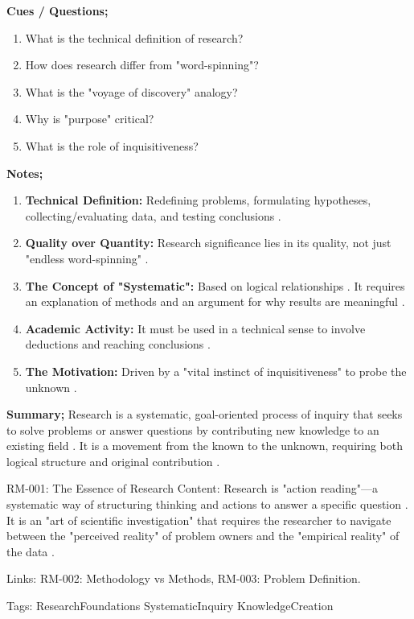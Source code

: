 \documentclass{report}
\begin{document}
\begin{cornellnotes}
	\textbf{Cues / Questions;}
	\begin{enumerate}
		\item What is the technical definition of research?
		\item How does research differ from "word-spinning"?
		\item What is the "voyage of discovery" analogy?
		\item Why is "purpose" critical?
		\item What is the role of inquisitiveness?
	\end{enumerate}
	\textbf{Notes;}
	\begin{enumerate}
		\item \textbf{Technical Definition:} Redefining problems, formulating hypotheses, collecting/evaluating data, and testing conclusions
		.
		\item \textbf{Quality over Quantity:} Research significance lies in its quality, not just "endless word-spinning"
		.
		\item \textbf{The Concept of "Systematic":} Based on logical relationships
		. It requires an explanation of methods and an argument for why results are meaningful
		.
		\item \textbf{Academic Activity:} It must be used in a technical sense to involve deductions and reaching conclusions
		.
		\item \textbf{The Motivation:} Driven by a "vital instinct of inquisitiveness" to probe the unknown
		.
	\end{enumerate}
	\textbf{Summary;}
	Research is a systematic, goal-oriented process of inquiry that seeks to solve problems or answer questions by contributing new knowledge to an existing field
	. It is a movement from the known to the unknown, requiring both logical structure and original contribution
	.
\end{cornellnotes}

\begin{zettelkasteinnotes}
RM-001: The Essence of Research Content: Research is "action reading"—a systematic way of structuring thinking and actions to answer a specific question
. It is an "art of scientific investigation" that requires the researcher to navigate between the "perceived reality" of problem owners and the "empirical reality" of the data
. 

Links: RM-002: Methodology vs Methods, RM-003: Problem Definition. 

Tags: ResearchFoundations SystematicInquiry KnowledgeCreation
\end{zettelkasteinnotes}
\end{document}
